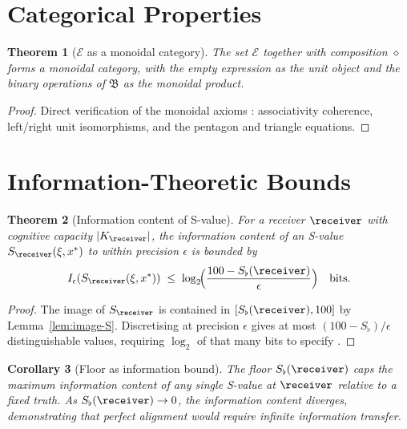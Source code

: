 \documentclass[11pt,a4paper]{article}
\theoremstyle{thmstyle}
\newtheorem{theorem}{Theorem}[section]
\newtheorem{corollary}[theorem]{Corollary}
\theoremstyle{thmstyle}
\theoremstyle{definition}
\theoremstyle{remark}
\newcommand{\Expr}{\mathcal{E}}
\newcommand{\Sscalar}{S}
\newcommand{\Sfloor}{S_{\flat}}
\begin{document}
\section{Categorical Properties}
\label{sec:categorical-properties}

\begin{theorem}[$\Expr$ as a monoidal category]
\label{thm:expr-monoidal}
The set $\Expr$ together with composition $\diamond$
forms a monoidal category, with the empty expression
as the unit object and the binary operations of
$\mathfrak{B}$ as the monoidal product.
\end{theorem}

\begin{proof}
Direct verification of the monoidal axioms
\citep{maclane1998}: associativity coherence,
left/right unit isomorphisms, and the pentagon and
triangle equations.
\end{proof}

\section{Information-Theoretic Bounds}
\label{sec:info-theoretic-bounds}

\begin{theorem}[Information content of S-value]
\label{thm:info-content}
For a receiver $\receiver$ with cognitive capacity
$|K_{\receiver}|$, the information content of an
S-value $\Sscalar_{\receiver}(\xi, x^{*})$ to within
precision $\epsilon$ is bounded by
\[
I_{\epsilon}(\Sscalar_{\receiver}(\xi, x^{*}))
\;\leq\; \log_{2}\!\Bigl(\frac{100 - \Sfloor(\receiver)}
                              {\epsilon}\Bigr)
\quad \text{bits}.
\]
\end{theorem}

\begin{proof}
The image of $\Sscalar_{\receiver}$ is contained in
$[\Sfloor(\receiver), 100]$ by
Lemma~\ref{lem:image-S}.  Discretising at precision
$\epsilon$ gives at most $(100 - \Sfloor)/\epsilon$
distinguishable values, requiring $\log_{2}$ of that
many bits to specify \citep{shannon1948,
coverthomas2006}.
\end{proof}

\begin{corollary}[Floor as information bound]
\label{cor:floor-info-bound}
The floor $\Sfloor(\receiver)$ caps the maximum
information content of any single S-value at
$\receiver$ relative to a fixed truth.  As
$\Sfloor(\receiver) \to 0$, the information content
diverges, demonstrating that perfect alignment
would require infinite information transfer.
\end{corollary}
\end{document}

